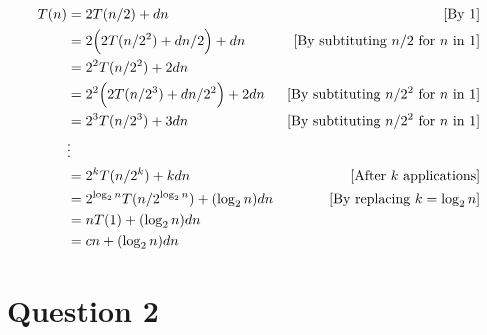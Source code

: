 \documentclass[12pt]{article}
\begin{document}
\begin{itemize}
\begin{mdframed}
        \begin{align}
            T(n) &= 2T(n/2) + dn & [\text{By 1}]\\
            &= 2\Bigl(2T(n/2^2) + dn/2\Bigr) + dn & [\text{By subtituting $n/2$ for $n$ in 1}]\\
            &= 2^2T(n/2^2) + 2dn\\
            &= 2^2\Bigl(2T(n/2^3) + dn/2^2\Bigr) + 2dn & [\text{By subtituting $n/2^2$ for $n$ in 1}]\\
            &= 2^3T(n/2^3) + 3dn & [\text{By subtituting $n/2^2$ for $n$ in 1}]\\
            &\vdots\\
            &= 2^kT(n/2^k) + kdn & [\text{After $k$ applications}]\\
            &= 2^{\log_2 n}T(n/2^{\log_2 n}) + (\log_2 n)dn & [\text{By replacing $k = \log_2 n$}]\\
            &= nT(1) + (\log_2 n)dn\\
            &= cn + (\log_2 n)dn
        \end{align}
    \end{mdframed}

\end{itemize}

\section*{Question 2}
\end{document}
